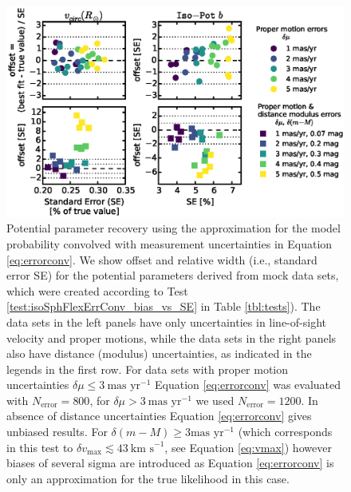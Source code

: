 
\begin{figure}[!htbp]
\centering
\includegraphics[width=\columnwidth]{figs/isoSphFlexErrConv_bias_vs_SE.eps}
\caption{Potential parameter recovery using the approximation for the model probability convolved with measurement uncertainties in Equation \ref{eq:errorconv}. We show  \pdf{} offset and relative width (i.e., standard error SE) for the potential parameters derived from mock data sets, which were created according to Test \ref{test:isoSphFlexErrConv_bias_vs_SE} in Table \ref{tbl:tests}). The data sets in the left panels have only uncertainties in line-of-sight velocity and proper motions, while the data sets in the right panels also have distance (modulus) uncertainties, as indicated in the legends in the first row. For data sets with proper motion uncertainties $\delta \mu \leq 3 \ \text{mas yr}^{-1}$ Equation \ref{eq:errorconv} was evaluated with $N_\text{error}=800$, for $\delta \mu > 3 \ \text{mas yr}^{-1}$ we used $N_\text{error}=1200$. In absence of distance uncertainties Equation \ref{eq:errorconv} gives unbiased results. For $\delta(m-M) \geq 3 \text{mas yr}^{-1}$ (which corresponds in this test to $\delta v_\text{max} \lesssim 43 \ \text{km s}^{-1}$, see Equation \ref{eq:vmax}) however biases of several sigma are introduced as Equation \ref{eq:errorconv} is only an approximation for the true likelihood in this case.}
\label{fig:isoSphFlexErrConv_bias_vs_SE}
\end{figure}





